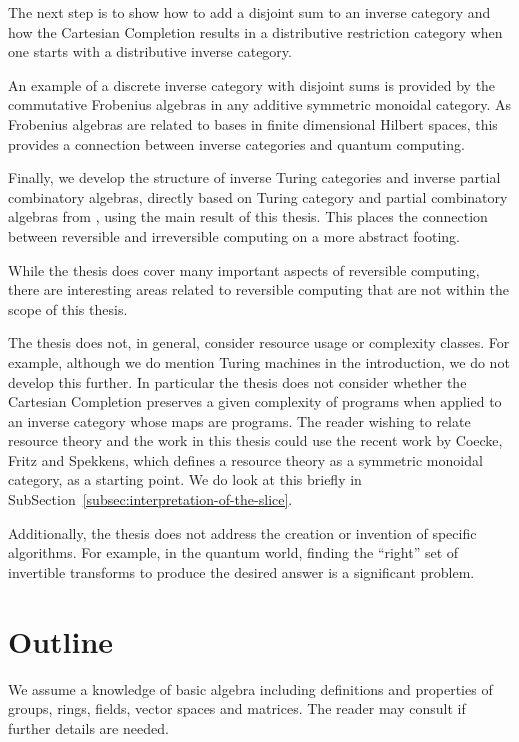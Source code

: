 The next step is to show how to add a disjoint sum to an inverse category and how the
Cartesian Completion results in a distributive restriction category when one starts with a
distributive inverse category.

An example of a discrete inverse category with disjoint sums is provided by the commutative
Frobenius algebras in any additive symmetric monoidal category. As Frobenius algebras are related to
bases in finite dimensional Hilbert spaces\cite{coeckeetal08:ortho}, this provides a connection
between inverse categories and quantum computing.

Finally, we develop the structure of inverse Turing categories and inverse partial combinatory
algebras, directly based on Turing category and partial combinatory algebras  from
\cite{cockett-hostra08-intro-to-turing,cockett2010:categories-and-computability}, using the main
result of this thesis. This places the connection between reversible and irreversible
computing on a more abstract footing.

While the thesis does cover many important aspects of reversible computing, there are interesting
areas related to reversible computing that are not within the scope of this thesis.

The thesis does not, in general, consider resource usage or complexity classes. For example,
although we do mention Turing machines in the introduction, we do not develop this further. In
particular the thesis does not consider whether the Cartesian Completion preserves a given
complexity of programs when applied to an inverse category whose maps are programs. The reader
wishing to relate resource theory and the work in this thesis could use the recent work by Coecke,
Fritz and Spekkens\cite{coecke2014mathematical}, which defines a resource
theory as a symmetric monoidal category, as a starting point. We do look at this briefly in
SubSection~\ref{subsec:interpretation-of-the-slice}.


Additionally, the thesis does not address the creation or invention of specific algorithms. For
example, in the quantum world, finding the ``right'' set of invertible transforms to produce the
desired answer is a significant problem\cite{neilsen2000:QuantumComputationAndInfo}.

\section{Outline} %
\label{sec:outline}

We assume a knowledge of basic algebra including definitions and properties of groups, rings,
fields, vector spaces and matrices. The reader may consult \cite{lang:algebra} if further details
are needed.

